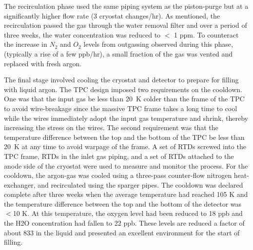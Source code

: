 The recirculation phase used the same piping system as the piston-purge but at a significantly higher flow rate (3 cryostat changes/hr). As mentioned, the recirculation passed the gas through the water removal filter and over a period of three weeks, the water concentration was reduced to $<$ 1 ppm. To counteract the increase in $N_2$ and $O_2$ levels from outgassing observed during this phase, (typically a rise of a few ppb/hr), a small fraction of the gas was vented and replaced with fresh argon. 

The final stage involved cooling the cryostat and detector to prepare for filling with liquid argon. The TPC design imposed two requirements on the cooldown. One was that  the input gas be less than 20~K colder than the frame of the TPC to avoid wire-breakage since the massive TPC frame takes a long time to cool while the wires immediately adopt the input gas temperature and shrink,  thereby increasing the stress on the wires.  The second requirement was that the temperature difference between the top and the bottom of the TPC be less than 20~K at any time to avoid warpage of the frame.  A set of RTDs screwed into the TPC frame, RTDs in the inlet gas piping, and a set of RTDs attached to the anode side of the cryostat were used to measure and monitor the process. For the cooldown, the argon-gas was cooled using a three-pass counter-flow nitrogen heat-exchanger, and recirculated using the sparger pipes. The cooldown was declared complete after three weeks when the average temperature had reached 105 K and the temperature difference between the top and the bottom of the detector was $<$10 K. At this temperature, the oxygen level had been reduced to 18 ppb and the H2O concentration had fallen to 22 ppb. These levels are reduced a factor of about 833 in the liquid and presented an excellent environment for the start of filling.

